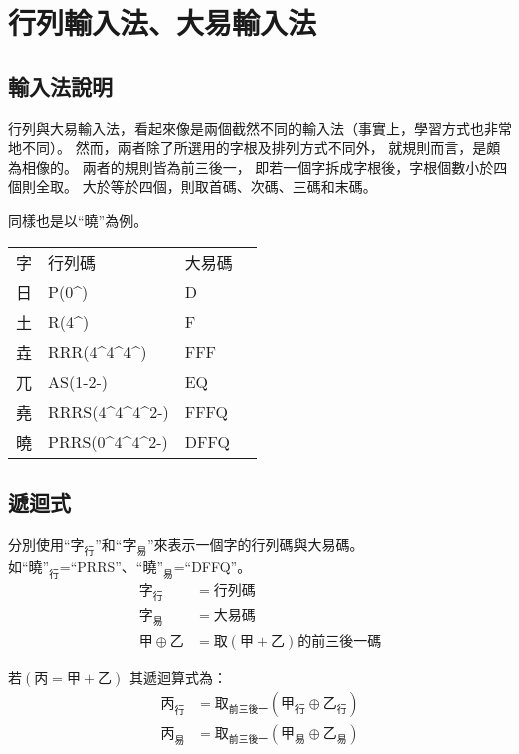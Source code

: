 \documentclass{article}
\def\tac{\textasciicircum}
\begin{document}
\section{行列輸入法、大易輸入法}
\subsection{輸入法說明}
行列與大易輸入法，看起來像是兩個截然不同的輸入法（事實上，學習方式也非常地不同）。%
然而，兩者除了所選用的字根及排列方式不同外，
就規則而言，是頗為相像的。
兩者的規則皆為前三後一，
即若一個字拆成字根後，字根個數小於四個則全取。
大於等於四個，則取首碼、次碼、三碼和末碼。

同樣也是以``曉''為例。\\
\begin{tabular}{llll}
字  & 行列碼 & 大易碼\\
日  & P(0\tac) & D\\
土  & R(4\tac) & F\\
垚  & RRR(4\tac4\tac4\tac) & FFF\\
兀  & AS(1-2-) & EQ\\
堯  & RRRS(4\tac4\tac4\tac2-) & FFFQ\\
曉  & PRRS(0\tac4\tac4\tac2-) & DFFQ\\
\end{tabular}

\subsection{遞迴式}
分別使用``$\mbox{字}_{\mbox{行}}$''和``$\mbox{字}_{\mbox{易}}$''來表示一個字的行列碼與大易碼。\\
如$\mbox{``曉''}_{\mbox{行}}$=``PRRS''、$\mbox{``曉''}_{\mbox{易}}$=``DFFQ''。
\begin{subequations}
  \begin{align}
  \mbox{字}_{\mbox{行}} &= 行列碼\\
  \mbox{字}_{\mbox{易}} &= 大易碼\\
  甲 \oplus 乙 &= 取(甲+乙)的前三後一碼
  \end{align}
\end{subequations}

若$(\mbox{丙}=\mbox{甲}+\mbox{乙})$
其遞迴算式為：
\begin{subequations}
  \begin{align}
  \mbox{丙}_{\mbox{行}}&=\mbox{取}_{\mbox{前三後一}}(\mbox{甲}_{\mbox{行}} \oplus \mbox{乙}_{\mbox{行}})\\
  \mbox{丙}_{\mbox{易}}&=\mbox{取}_{\mbox{前三後一}}(\mbox{甲}_{\mbox{易}} \oplus \mbox{乙}_{\mbox{易}})
  \end{align}
\end{subequations}
\end{document}
